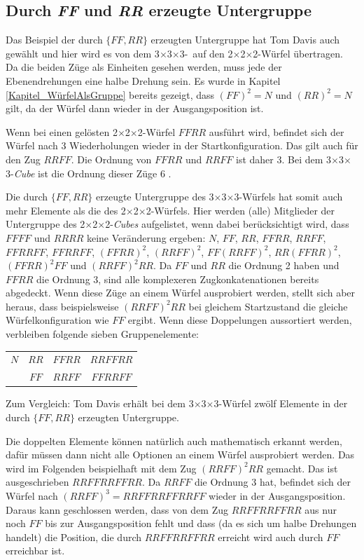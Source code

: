 \documentclass[12pt,a4paper, usenames, dvipsnames]{article}
\theoremstyle{mystyle}
\theoremstyle{definition}
\newcommand{\Ttwo}{2$\times$2$\times$2-}
\newcommand{\Tthree}{3$\times$3$\times$3-}
\begin{document}
\subsection{Durch \textit{FF} und \textit{RR} erzeugte Untergruppe}

Das Beispiel der durch $\{ FF, RR \}$ erzeugten Untergruppe hat Tom Davis auch gewählt \cite{TD} und hier wird es von dem \Tthree \ auf den \Ttwo Würfel übertragen.
Da die beiden Züge als Einheiten gesehen werden, muss jede der Ebenendrehungen eine halbe Drehung sein.
Es wurde in Kapitel \ref{Kapitel_WürfelAlsGruppe} bereits gezeigt, dass $(FF)^2 = N$ und $(RR)^2 = N$ gilt, da der Würfel dann wieder in der Ausgangsposition ist.

Wenn bei einen gelösten \Ttwo Würfel $FFRR$ ausführt wird, befindet sich der Würfel nach 3 Wiederholungen wieder in der Startkonfiguration. Das gilt auch für den Zug $RRFF$. Die Ordnung von $FFRR$ und $RRFF$ ist daher 3. Bei dem \Tthree \textit{Cube} ist die Ordnung dieser Züge 6 \cite{TD}.

Die durch $\{ FF, RR \}$ erzeugte Untergruppe des \Tthree Würfels hat somit auch mehr Elemente als die des \Ttwo Würfels. Hier werden (alle) Mitglieder der Untergruppe des \Ttwo \textit{Cubes} aufgelistet, wenn dabei berücksichtigt wird, dass $FFFF$ und $RRRR$ keine Veränderung ergeben: $N$, $FF$, $RR$, $FFRR$, $RRFF$, $FFRRFF$, $FFRRFF$, $(FFRR)^2$, $(RRFF)^2$, $FF(RRFF)^2$, $RR(FFRR)^2$, $(FFRR)^2FF$ und $(RRFF)^2RR$. Da $FF$ und $RR$ die Ordnung 2 haben und $FFRR$ die Ordnung 3, sind alle komplexeren Zugkonkatenationen bereits abgedeckt.
Wenn diese Züge an einem Würfel ausprobiert werden, stellt sich aber heraus, dass beispielsweise $(RRFF)^2RR$ bei gleichem Startzustand die gleiche Würfelkonfiguration wie $FF$ ergibt. Wenn diese Doppelungen aussortiert werden, verbleiben folgende sieben Gruppenelemente:
\begin{center}
\centering
\begin{tabular}{c c c c}
$N$ & $RR$ & $FFRR$ &  $RRFFRR$ \\
& $FF$ & $RRFF$ & $FFRRFF$   \\
\end{tabular}
\end{center}
Zum Vergleich: Tom Davis erhält bei dem  \Tthree Würfel zwölf Elemente in der durch $\{ FF, RR \}$ erzeugten Untergruppe.

Die doppelten Elemente können natürlich auch mathematisch erkannt werden, dafür müssen dann nicht alle Optionen an einem Würfel ausprobiert werden.
Das wird im Folgenden beispielhaft mit dem Zug $(RRFF)^2RR$ gemacht. Das ist ausgeschrieben $RRFFRRFFRR$. Da $RRFF$ die Ordnung 3 hat, befindet sich der Würfel nach $(RRFF)^3 = RRFFRRFFRRFF$ wieder in der Ausgangsposition. Daraus kann geschlossen werden, dass von dem Zug $RRFFRRFFRR$ aus nur noch $FF$ bis zur Ausgangsposition fehlt und dass (da es sich um halbe Drehungen handelt) die Position, die durch $RRFFRRFFRR$ erreicht wird auch durch $FF$ erreichbar ist.
\end{document}
